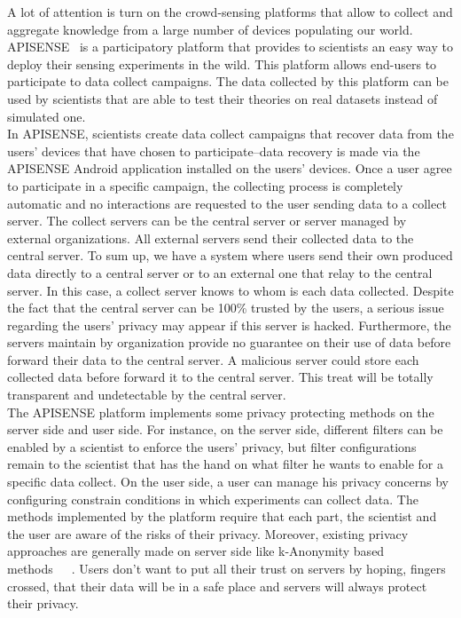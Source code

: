 


A lot of attention is turn on the crowd-sensing platforms that allow to collect and aggregate knowledge from a large number of devices populating our world.
APISENSE~\cite{DBLP:conf/dais/HadererRS13} is a participatory platform that provides to scientists an easy way to deploy their sensing experiments in the wild.
This platform allows end-users to participate to data collect campaigns.
The data collected by this platform can be used by scientists that are able to test their theories on real datasets instead of simulated one.
\\

In APISENSE, scientists create data collect campaigns that recover data from the users' devices that have chosen to participate--data recovery is made via the APISENSE Android application installed on the users' devices.
Once a user agree to participate in a specific campaign, the collecting process is completely automatic and no interactions are requested to the user sending data to a collect server.
The collect servers can be the central server or server managed by external organizations.
All external servers send their collected data to the central server.
To sum up, we have a system where users send their own produced data directly to a central server or to an external one that relay to the central server.
In this case, a collect server knows to whom is each data collected.
Despite the fact that the central server can be 100\% trusted by the users, a serious issue regarding the users' privacy may appear if this server is hacked.
Furthermore, the servers maintain by organization provide no guarantee on their use of data before forward their data to the central server.
A malicious server could store each collected data before forward it to the central server.
This treat will be totally transparent and undetectable by the central server.
\\

The APISENSE platform implements some privacy protecting methods on the server side and user side.
For instance, on the server side, different filters can be enabled by a scientist to enforce the users' privacy, but filter configurations remain to the scientist that has the hand on what filter he wants to enable for a specific data collect.
On the user side, a user can manage his privacy concerns by configuring constrain conditions in which experiments can collect data.
The methods implemented by the platform require that each part, the scientist and the user are aware of the risks of their privacy.
Moreover, existing privacy approaches are generally made on server side like k-Anonymity based methods~\cite{DBLP:journals/ijufks/Sweene02}~\cite{DBLP:conf/icde/LiLV07}~\cite{DBLP:conf/icde/MachanavajjhalaGKV06}.
Users don't want to put all their trust on servers by hoping, fingers crossed, that their data will be in a safe place and servers will always protect their privacy.
\\

